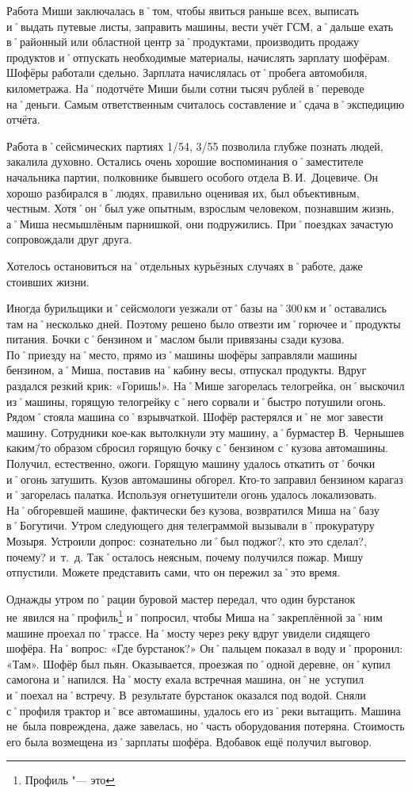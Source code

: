 Работа Миши заключалась в˚том, чтобы явиться раньше всех, выписать и˚выдать путевые листы, заправить машины, вести учёт ГСМ, а˚дальше ехать в˚районный или областной центр за˚продуктами, производить продажу продуктов и˚отпускать необходимые материалы, начислять зарплату шофёрам. Шофёры работали сдельно. Зарплата начислялась от˚пробега автомобиля, километража. На˚подотчёте Миши были сотни тысяч рублей в˚переводе на˚деньги. Самым ответственным считалось составление и˚сдача в˚экспедицию отчёта.

Работа в˚сейсмических партиях 1/54, 3/55 позволила глубже познать людей, закалила духовно. Остались очень хорошие воспоминания о˚заместителе начальника партии, полковнике бывшего особого отдела В.\,И.~Доцевиче. Он хорошо разбирался в˚людях, правильно оценивая их, был объективным, честным. Хотя˚он˚был уже опытным, взрослым человеком, познавшим жизнь, а˚Миша несмышлёным парнишкой, они подружились. При˚поездках зачастую сопровождали друг друга.

Хотелось остановиться на˚отдельных курьёзных случаях в˚работе, даже стоивших жизни. 

Иногда бурильщики и˚сейсмологи уезжали от˚базы на˚300\,км и˚оставались там на˚несколько дней. Поэтому решено было отвезти им˚горючее и˚продукты питания. Бочки с˚бензином и˚маслом были привязаны сзади кузова. По˚приезду на˚место, прямо из˚машины шофёры заправляли машины бензином, а˚Миша, поставив на˚кабину весы, отпускал продукты. Вдруг раздался резкий крик: «Горишь!». На˚Мише загорелась телогрейка, он˚выскочил из˚машины, горящую телогрейку с˚него сорвали и˚быстро потушили огонь. Рядом˚стояла машина со˚взрывчаткой. Шофёр растерялся и˚не~мог завести машину. Сотрудники кое-как вытолкнули эту машину, а˚бурмастер В.~Чернышев каким\=/то образом сбросил горящую бочку с˚бензином с˚кузова автомашины. Получил, естественно, ожоги. Горящую машину удалось откатить от˚бочки и˚огонь затушить. Кузов автомашины обгорел. Кто-то заправил бензином карагаз и˚загорелась палатка. Используя огнетушители огонь удалось локализовать. На˚обгоревшей машине, фактически без кузова, возвратился Миша на˚базу в˚Богутичи. Утром следующего дня телеграммой вызывали в˚прокуратуру Мозыря. Устроили допрос: сознательно ли˚был поджог?, кто это сделал?, почему? и~т.~д. Так˚осталось неясным, почему получился пожар. Мишу отпустили. Можете представить сами, что он пережил за˚это время.

Однажды утром по˚рации буровой мастер передал, что один бурстанок не~явился на˚профиль\footnote{Профиль "--- это } и˚попросил, чтобы Миша на˚закреплённой за˚ним машине проехал по˚трассе. На˚мосту через реку вдруг увидели сидящего шофёра. На˚вопрос: «Где бурстанок?» Он˚пальцем показал в воду и˚проронил: «Там». Шофёр был пьян. Оказывается, проезжая по˚одной деревне, он˚купил самогона и˚напился. На˚мосту ехала встречная машина, он˚не~уступил и˚поехал на˚встречу. В~результате бурстанок оказался под водой. Сняли с˚профиля трактор и˚все автомашины, удалось его из˚реки вытащить. Машина не~была повреждена, даже завелась, но˚часть оборудования потеряна. Стоимость его была возмещена из˚зарплаты шофёра. Вдобавок ещё получил выговор. 

